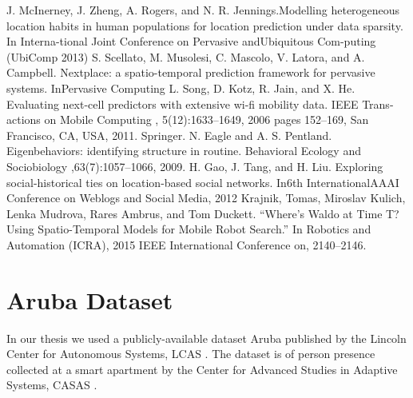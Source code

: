 \documentclass[11pt]{book}
\begin{document}
\begin{thebibliography}{99}

 J.  McInerney,  J.  Zheng,  A.  Rogers,  and  N.  R.  Jennings.Modelling heterogeneous location habits in human populations for location prediction under data sparsity. In Interna-tional Joint Conference on Pervasive andUbiquitous Com-puting (UbiComp 2013)
  S.  Scellato,   M.  Musolesi,   C.  Mascolo,   V.  Latora,   and A.  Campbell. Nextplace:   a  spatio-temporal  prediction framework for pervasive systems.  InPervasive Computing
 L. Song, D. Kotz, R. Jain, and X. He.  Evaluating next-cell predictors with extensive wi-fi mobility data. IEEE Trans-actions on Mobile Computing , 5(12):1633–1649, 2006 pages 152–169, San Francisco, CA, USA, 2011. Springer.
N. Eagle and A. S. Pentland.   Eigenbehaviors:  identifying structure in routine. Behavioral Ecology and Sociobiology ,63(7):1057–1066, 2009.
 H.  Gao,  J.  Tang,  and  H.  Liu.   Exploring  social-historical ties on location-based social networks.  In6th InternationalAAAI Conference on Weblogs and Social Media, 2012
 Krajnik, Tomas, Miroslav Kulich, Lenka Mudrova, Rares Ambrus, and Tom Duckett. “Where’s Waldo at Time T? Using Spatio-Temporal Models for Mobile Robot Search.” In Robotics and Automation (ICRA), 2015 IEEE International Conference on, 2140–2146.

\end{thebibliography}



\section{Aruba Dataset}
In our thesis we used a  publicly-available  dataset  Aruba published by the Lincoln Center for Autonomous Systems, LCAS . The dataset is of person presence collected at a smart apartment by the Center for Advanced Studies in Adaptive Systems, CASAS .
\end{document}
